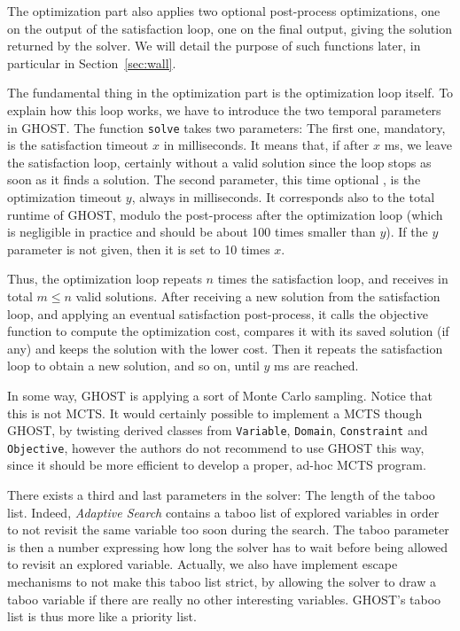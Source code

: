 \documentclass[journal]{IEEEtran}
\newcommand{\ghost}{\textsc{GHOST}\xspace}
\begin{document}
The  optimization   part  also   applies  two   optional  post-process
optimizations, one on the output of  the satisfaction loop, one on the
final output,  giving the  solution returned by  the solver.   We will
detail  the  purpose  of  such   functions  later,  in  particular  in
Section~\ref{sec:wall}.

The fundamental  thing in  the optimization  part is  the optimization
loop itself. To explain how this  loop works, we have to introduce the
two temporal  parameters in \ghost. The  function \texttt{solve} takes
two parameters: The first one,  mandatory, is the satisfaction timeout
$x$ in  milliseconds.  It means  that, if after  $x$ ms, we  leave the
satisfaction loop, certainly  without a valid solution  since the loop
stops as soon  as it finds a solution. The  second parameter, this time optional
, is the optimization timeout $y$, always in milliseconds. It
corresponds  also  to   the  total  runtime  of   \ghost,  modulo  the
post-process  after  the optimization  loop  (which  is negligible  in
practice and should  be about 100 times smaller than  $y$). If the $y$
parameter is not given, then it is set to 10 times $x$.

Thus, the optimization  loop repeats $n$ times  the satisfaction loop,
and receives  in total $m \leq  n$ valid solutions. After  receiving a
new  solution from  the satisfaction  loop, and  applying an  eventual
satisfaction post-process, it calls  the objective function to compute
the optimization  cost, compares it  with its saved solution  (if any)
and  keeps the  solution with  the lower  cost.  Then  it repeats  the
satisfaction loop  to obtain a new  solution, and so on,  until $y$ ms
are reached.

In some way, \ghost is applying a sort of Monte Carlo sampling. Notice
that this  is not MCTS.   It would  certainly possible to  implement a
MCTS    though   \ghost,    by   twisting    derived   classes    from
\texttt{Variable},     \texttt{Domain},    \texttt{Constraint}     and
\texttt{Objective}, however the authors do not recommend to use \ghost
this  way, since  it should  be more  efficient to  develop a  proper,
ad-hoc MCTS program.

There exists a third and last  parameters in the solver: The length of
the taboo list.  Indeed, {\it Adaptive  Search} contains a taboo list of
explored variables in order to not  revisit the same variable too soon
during the search. The taboo parameter  is then a number expressing how
long  the solver  has  to  wait before  being  allowed  to revisit  an
explored variable. Actually, we  also have implement escape mechanisms
to not make  this taboo list strict,  by allowing the solver  to draw a
taboo   variable   if   there   are   really   no   other   interesting
variables. \ghost's taboo list is thus more like a priority list.
\end{document}
